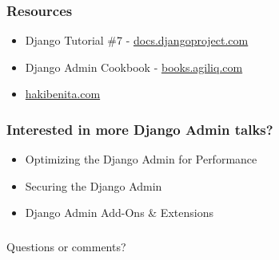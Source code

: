 \documentclass[aspectratio=169]{beamer}
\begin{document}
\begin{frame}
\frametitle{Resources}
  \begin{itemize}
    \item {\small Django Tutorial \#7 - \href{https://docs.djangoproject.com/en/2.2/intro/tutorial07/}{docs.djangoproject.com}}
    \item {\small Django Admin Cookbook - \href{https://books.agiliq.com/projects/django-admin-cookbook}{books.agiliq.com}}
    \item {\small \href{https://hakibenita.com/tag/django-admin}{hakibenita.com}}
  \end{itemize}
\end{frame}


\begin{frame}
\frametitle{Interested in more Django Admin talks?}
  \begin{itemize}
    \item {\small Optimizing the Django Admin for Performance}
    \item {\small Securing the Django Admin}
    \item {\small Django Admin Add-Ons \& Extensions}
  \end{itemize}
\end{frame}


\begin{frame}
\frametitle{}
  {\huge Questions or comments?}
\end{frame}
\end{document}
